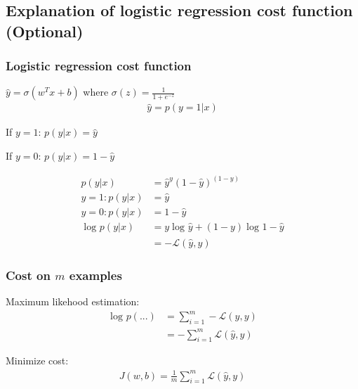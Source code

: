 \subsection{Explanation of logistic regression cost function (Optional)}
\subsubsection{Logistic regression cost function}
$\hat{y} = \sigma(w^Tx + b)$ where $\sigma(z) = \frac{1}{1 + e^{-z}}$
\begin{align}
	\hat{y} = p(y = 1 | x)
\end{align}


If $y = 1$: $p(y|x) = \hat{y}$

If $y = 0$: $p(y|x) = 1 - \hat{y}$

\begin{align}
	p(y|x) &= \hat{y}^y (1-\hat{y})^{(1-y)} \\
	y = 1: p(y|x) &= \hat{y} \\
	y = 0: p(y|x) &= 1 - \hat{y} \\
	\log_{}{p(y|x)} &= y\log_{}{\hat{y}} + (1-y)\log_{}{1 - \hat{y}} \\
					   &= -\mathcal{L}(\hat{y}, y)
\end{align}


\subsubsection{Cost on $m$ examples}
Maximum likehood estimation:
\begin{align}
	\log_{}{p(...)} &= \sum_{i = 1}^{m} -\mathcal{L}(\hat{y}, y) \\
					   &= -\sum_{i = 1}^{m} \mathcal{L}(\hat{y}, y)
\end{align}

Minimize cost:
\begin{align}
	J(w, b) = \frac{1}{m} \displaystyle\sum_{i=1}^m \mathcal{L}(\hat{y}, y)
\end{align}
